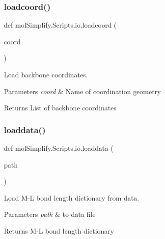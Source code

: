 \subsubsection{\texorpdfstring{loadcoord()}{loadcoord()}}
{\footnotesize\ttfamily def mol\+Simplify.\+Scripts.\+io.\+loadcoord (\begin{DoxyParamCaption}\item[{}]{coord }\end{DoxyParamCaption})}



Load backbone coordinates. 


\begin{DoxyParams}{Parameters}
{\em coord} & Name of coordination geometry \\
\hline
\end{DoxyParams}
\begin{DoxyReturn}{Returns}
List of backbone coordinates 
\end{DoxyReturn}
\mbox{\label{namespacemolSimplify_1_1Scripts_1_1io_adfd1292cc6dcfdbf6b828fe5e7d9ae1f}} 
\subsubsection{\texorpdfstring{loaddata()}{loaddata()}}
{\footnotesize\ttfamily def mol\+Simplify.\+Scripts.\+io.\+loaddata (\begin{DoxyParamCaption}\item[{}]{path }\end{DoxyParamCaption})}



Load M-\/L bond length dictionary from data. 


\begin{DoxyParams}{Parameters}
{\em path} & to data file \\
\hline
\end{DoxyParams}
\begin{DoxyReturn}{Returns}
M-\/L bond length dictionary 
\end{DoxyReturn}
\mbox{\label{namespacemolSimplify_1_1Scripts_1_1io_a46e78fd50789df0a774ccbe02fb87206}} 
